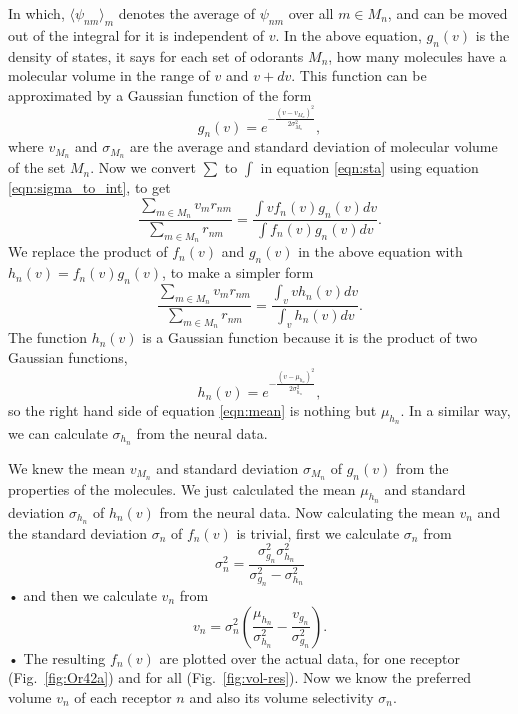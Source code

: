 \documentclass[11pt]{paper} %
\begin{document}
In which, 
$\langle \psi_{nm} \rangle_m$ denotes the average of $\psi_{nm}$ over all $m \in M_n$, 
and can be moved out of the integral for it is independent of $v$.
In the above equation, 
$g_n(v)$ is the density of states, it says for each set of odorants $M_n$, how many molecules have a molecular volume in the range of $v$ and $v+dv$.
This function can be approximated by a Gaussian function of the form 
\[
g_n(v) = e^{-\frac{(v- v_{M_n})^2}{2\sigma_{M_n}^2}},
\]
where $v_{M_n}$ and $\sigma_{M_n}$ are the average and standard deviation of molecular volume of the set $M_n$.
Now we convert $\sum$ to $\int$ in equation \ref{eqn:sta} using equation \ref{eqn:sigma_to_int}, to get
\begin{equation}
\frac{\displaystyle \sum_{m\in M_n} v_m r_{nm}}{\displaystyle \sum_{m\in M_n} r_{nm}} = \frac{\displaystyle \int v f_n(v) g_n(v) dv}{\displaystyle \int f_n(v) g_n(v) dv}.
\label{eqn:sta_int}
\end{equation}
We replace the product of $f_n(v)$ and $g_n(v)$ in the above equation with $h_n(v) = f_n(v) g_n(v)$, to make a simpler form
\begin{equation}
\frac{\displaystyle \sum_{m\in M_n} v_m r_{nm}}{\displaystyle \sum_{m\in M_n} r_{nm}} = \frac{\displaystyle \int_v v h_n(v) dv}{ \displaystyle \int_v  h_n(v) dv }.
\label{eqn:mean}
\end{equation}
The function $h_n(v)$ is a Gaussian function because it is the product of two Gaussian functions, 
\[
h_n(v) = e^{-\frac{(v-\mu_{h_n})^2}{2\sigma_{h_n}^2}}, 
\]
so the right hand side of equation \ref{eqn:mean} is nothing but $\mu_{h_n}$. 
In a similar way, we can calculate $\sigma_{h_n}$ from the neural data.

We knew the mean $v_{M_n}$ and standard deviation $\sigma_{M_n}$ of $g_n(v)$ from the properties of the molecules. 
We just calculated the mean $\mu_{h_n}$ and standard deviation $\sigma_{h_n}$ of $h_n(v)$ from the neural data.
Now calculating the mean $v_n$ and the standard deviation $\sigma_n$ of $f_n(v)$ is trivial,
first we calculate $\sigma_n$ from 
\begin{equation}
\sigma_n^2 = \frac{\sigma^2_{g_n} \sigma^2_{h_n}}{\sigma^2_{g_n} - \sigma^2_{h_n}}
\end{equation}•
and then we calculate $v_n$ from 
\begin{equation}
v_n =  \sigma_n^2 \left ( \frac{\mu_{h_n}}{\sigma^2_{h_n}} - \frac{v_{g_n}}{\sigma^2_{g_n}} \right ).
\end{equation}•
The resulting $f_n(v)$ are plotted over the actual data, for one receptor (Fig.~\ref{fig:Or42a}) and for all (Fig.~\ref{fig:vol-res}).
Now we know the preferred volume $v_n$ of each receptor $n$ and also its volume selectivity $\sigma_n$.
\end{document}
